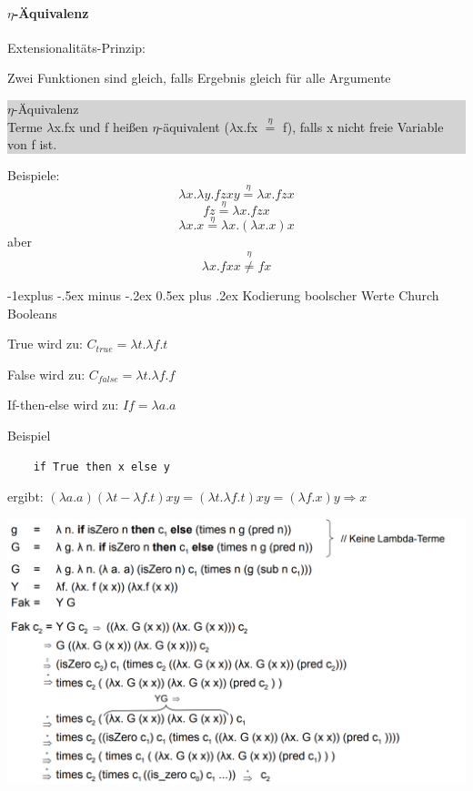 \documentclass[10pt]{article}
\makeatletter
\renewcommand{\subsection}{\@startsection{subsection}{2}{0mm}%
                                {-1explus -.5ex minus -.2ex}%
                                {0.5ex plus .2ex}%
                                {\normalfont\normalsize\bfseries}}
\makeatother
\begin{document}
\paragraph{$\eta$-Äquivalenz}

Extensionalitäts-Prinzip: 
\begin{itemize*}
  \item Zwei Funktionen sind gleich, falls Ergebnis gleich für alle Argumente
\end{itemize*}
\colorbox{lightgray} {
  \begin{minipage}[h]{1.0\linewidth}
    $\eta$-Äquivalenz \\
    Terme $\lambda$x.fx und f heißen $\eta$-äquivalent ($\lambda$x.fx $\stackrel{\eta}{=}$ f), falls x nicht freie Variable von f ist.
  \end{minipage}
}

Beispiele:
$$\lambda x.\lambda y.f z x y \stackrel{\eta}{=}\lambda x.f z x$$
$$f z \stackrel{\eta}{=}\lambda x.f z x$$
$$\lambda x.x \stackrel{\eta}{=}\lambda x.(\lambda x.x)x$$
aber $$\lambda x.f x x \stackrel{\eta}{\neq} f x$$

\subsection{Kodierung boolscher Werte}
Church Booleans
\begin{itemize*}
  \item True wird zu: $C_{true} = \lambda t.\lambda f.t$
  \item False wird zu: $C_{false} = \lambda t.\lambda f.f$
  \item If-then-else wird zu: $If = \lambda a.a$
\end{itemize*}

Beispiel
\begin{lstlisting}
    if True then x else y
\end{lstlisting}
ergibt: $(\lambda a.a)(\lambda t- \lambda f.t) x y = (\lambda t.\lambda f.t) xy = (\lambda f.x)y \Rightarrow x$

\begin{center}
  \includegraphics[width=0.4\linewidth]{Assets/Programmierparadigmen-Lambda_Abstraktion.png}
\end{center}
\end{document}
